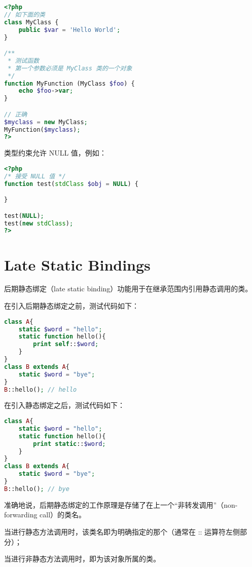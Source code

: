 \begin{lstlisting}[language=PHP]
<?php
// 如下面的类
class MyClass {
    public $var = 'Hello World';
}

/**
 * 测试函数
 * 第一个参数必须是 MyClass 类的一个对象
 */
function MyFunction (MyClass $foo) {
    echo $foo->var;
}

// 正确
$myclass = new MyClass;
MyFunction($myclass);
?>
\end{lstlisting}

类型约束允许 NULL 值，例如：


\begin{lstlisting}[language=PHP]
<?php
/* 接受 NULL 值 */
function test(stdClass $obj = NULL) {

}

test(NULL);
test(new stdClass);
?>
\end{lstlisting}


\chapter{Late Static Bindings}


后期静态绑定（late static binding）功能用于在继承范围内引用静态调用的类。

在引入后期静态绑定之前，测试代码如下：




\begin{lstlisting}[language=PHP]
class A{
	static $word = "hello";
	static function hello(){
		print self::$word;
	}
}
class B extends A{
	static $word = "bye"; 
}
B::hello(); // hello
\end{lstlisting}

在引入静态绑定之后，测试代码如下：


\begin{lstlisting}[language=PHP]
class A{
	static $word = "hello";
	static function hello(){
		print static::$word;
	}
}
class B extends A{
	static $word = "bye";
}
B::hello(); // bye
\end{lstlisting}


准确地说，后期静态绑定的工作原理是存储了在上一个“非转发调用”（non-forwarding call）的类名。

\begin{compactitem}
\item 当进行静态方法调用时，该类名即为明确指定的那个（通常在 :: 运算符左侧部分）；
\item 当进行非静态方法调用时，即为该对象所属的类。
\end{compactitem}


